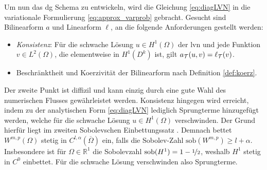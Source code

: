Um nun das \ac{dg} Schema zu entwickeln, wird die Gleichung \eqref{eq:diagLVN} in die variationale Formulierung \eqref{eq:approx_varprob} gebracht. Gesucht sind Bilinearform $a$ und Linearform $\ell$, an die folgende Anforderungen gestellt werden:
\begin{itemize}
  \item \emph{Konsistenz}: Für die schwache Lösung $u\in H^1(\Omega)$ der \ac{lvn} und jede Funktion $v\in L^2(\Omega)$, die elementweise in $H^1(D^k)$ ist, gilt ${a_{\mathcal{T}}(u,v)=\ell_{\mathcal{T}}(v)}$.
  \item Beschränktheit und Koerzivität der Bilinearform nach Definition \ref{def:koerz}.
\end{itemize}
Der zweite Punkt ist diffizil und kann einzig durch eine gute Wahl des numerischen Flusses gewährleistet werden.
Konsistenz hingegen wird erreicht, indem zu der analytischen Form \eqref{eq:diagLVN} lediglich Sprungterme hinzugefügt werden, welche für die schwache Lösung $u\in H^1(\Omega)$ verschwinden. Der Grund hierfür liegt im zweiten Sobolevschen Einbettungssatz \cite{buchPietro}. Demnach bettet $W^{m,p}(\Omega)$ stetig in $C^{l,\alpha}(\overline{\Omega})$ ein, falls die Sobolev-Zahl ${\text{sob}(W^{m,p})\geq l+\alpha}$.
Insbesondere ist für $\Omega\in\mathbb{R}^1$ die Sobolevzahl $\text{sob}(H^1) = 1-\nicefrac{1}{2}$, weshalb $H^1$ stetig in $C^0$ einbettet. Für die schwache Lösung verschwinden also Sprungterme.

